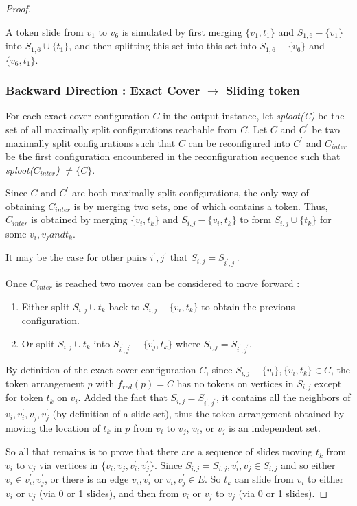 \begin{proof}
\begin{example}A token slide from $v_1$ to $v_6$ is simulated by first merging $\{v_1, t_1\}$ and $S_{1,6} - \{v_1\}$ into $S_{1,6} \cup \{t_1\}$, and then splitting this set into this set into $S_{1,6} - \{v_6\}$ and $\{v_6, t_1\}$.

\end{example}

\subsubsection{Backward Direction : Exact Cover $\rightarrow$ Sliding token}
For each exact cover configuration $C$ in the output instance, let \textit{sploot(C)} be the set of all maximally split configurations reachable from $C$. Let $C$ and $C^{'}$ be two maximally split configurations such that $C$ can be reconfigured into $C^{'}$ and $C_{inter}$ be the first configuration encountered in the reconfiguration sequence such that \textit{sploot($C_{inter}$)} $\neq \{C\}$.

\begin{obs}
Since $C$ and $C^{'}$ are both maximally split configurations, the only way of obtaining $C_{inter}$ is by merging two sets, one of which contains a token. Thus, $C_{inter}$ is obtained by merging $\{v_i, t_k\}$ and $S_{i,j} - \{v_i, t_k\}$  to form $S_{i,j} \cup \{t_k\}$ for some $v_i, v_j and t_k$.
\end{obs}

\begin{remark}
It may be the case for other pairs $i^{'}, j^{'}$ that $S_{i,j} = S_{i^{'}, j^{'}}$.
\end{remark}

Once $C_{inter}$ is reached two moves can be considered to move forward :
\begin{enumerate}
  \item Either split $S_{i,j} \cup t_k$ back to $S_{i,j} - \{v_i,t_k\}$ to obtain the previous configuration.
  \item Or split $S_{i,j} \cup t_k$ into $S_{i^{'},j^{'}} - \{v_j^{'},t_k\}$ where $S_{i,j} = S_{i^{'}, j^{'}}$.
\end{enumerate}

By definition of the exact cover configuration $C$, since $S_{i,j} - \{v_i\}, \{v_i, t_k\} \in C$, the token arrangement $p$ with $f_{red}(p) = C$ has no tokens on vertices in $S_{i,j}$ except for token $t_k$ on $v_i$. Added the fact that $S_{i,j} = S_{i^{'}, j^{'}}$, it contains all the neighbors of $v_i, v_i^{'}, v_j, v_j^{'}$ (by definition of a slide set), thus the token arrangement obtained by moving the location of $t_k$ in $p$ from $v_i$ to $v_j$, $v_i$, or $v_j$ is an independent set.

So all that remains is to prove that there are a sequence of slides moving $t_k$ from $v_i$ to $v_j$ via vertices
in $\{v_i, v_j, v_i^{'}, v_j^{'}\}$. Since $S_{i,j} = S_{i,j}, v^{'}_i, v^{'}_j \in S_{i,j}$ and so either $v_i \in {v^{'}_i, v^{'}_j}$, or there is an edge ${v_i, v^{'}_i}$ or ${v_i, v^{'}_j} \in E$. So $t_k$ can slide from $v_i$ to either $v_i$ or $v_j$ (via 0 or 1 slides), and then from $v_i$ or $v_j$ to $v_j$ (via 0 or 1 slides).
\end{proof}

